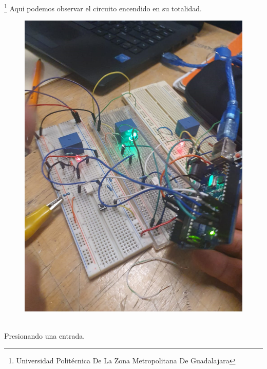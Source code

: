 \documentclass[11pt,a4paper]{article}
\begin{document}
\footnote{Universidad Politécnica De La Zona Metropolitana De Guadalajara}
\newpage
Aqui podemos observar el circuito encendido en su totalidad.
\begin{figure}[hbtp]
\centering
\includegraphics[scale=0.30]{002.png} 
\end{figure}\\
Presionando una entrada.
\end{document}

